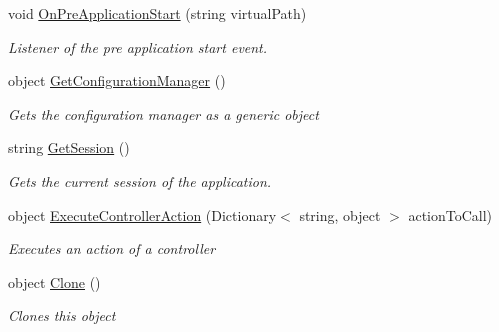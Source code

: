 \begin{DoxyCompactItemize}
void \hyperlink{class_mvc_1_1_p_http_application_af4ab5d8d6f1db0a740617bd686fd0e4a}{On\+Pre\+Application\+Start} (string virtual\+Path)
\begin{DoxyCompactList}\small\item\em Listener of the pre application start event. \end{DoxyCompactList}\item 
object \hyperlink{class_mvc_1_1_p_http_application_a9dc63c8a87637cf4ffdf3ec78f3261a2}{Get\+Configuration\+Manager} ()
\begin{DoxyCompactList}\small\item\em Gets the configuration manager as a generic object \end{DoxyCompactList}\item 
string \hyperlink{class_mvc_1_1_p_http_application_a4970faea54350be3fb4575014f7b58ec}{Get\+Session} ()
\begin{DoxyCompactList}\small\item\em Gets the current session of the application. \end{DoxyCompactList}\item 
object \hyperlink{class_mvc_1_1_p_http_application_a4de3706c2afcbfb56c98a7ca820f53a7}{Execute\+Controller\+Action} (Dictionary$<$ string, object $>$ action\+To\+Call)
\begin{DoxyCompactList}\small\item\em Executes an action of a controller \end{DoxyCompactList}\item 
object \hyperlink{class_mvc_1_1_p_http_application_a9497e9f68b567946aa16f67c9536bb21}{Clone} ()
\begin{DoxyCompactList}\small\item\em Clones this object \end{DoxyCompactList}\end{DoxyCompactItemize}

